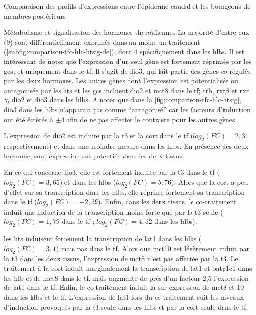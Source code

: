 \documentclass[../main.tex]{subfiles}
\begin{document}
\begin{chapter}{Comparaison des profils d'expressions entre l'épiderme caudal et les bourgeons de membres postérieurs}
\begin{section}{Métabolisme et signalisation des hormones thyroïdiennes}
La majorité d'entre eux (9) sont différentiellement exprimés dans au moins un traitement (\autoref{subfig:comparison-tfc-hlc-htsig-de}), dont 4 spécifiquement dans les \glspl{hlb}.
Il est intéressant de noter que l'expression d'un seul gène est fortement réprimée par les \glspl{gc}, et uniquement dans le \gls{tf}.
Il s'agit de \gls{dio3}, qui fait partie des gènes co-régulés par les deux hormones.
Les autres gènes dont l'expression est potentialisée ou antagonisée par les \glspl{ht} et les \glspl{gc} incluent \gls{dio2} et \gls{mct}8 dans le \gls{tf}; \gls{trb}, \gls{rxr}$\beta$ et \gls{rxr}$\gamma$, \gls{dio2} et \gls{dio3} dans les \glspl{hlb}.
A noter que dans la \autoref{fig:comparison-tfc-hlc-htsig}, \gls{dio3} dans les \glspl{hlb} n'apparait pas comme ``antagonisé'' car les facteurs d'induction ont été écrêtés à $\pm 4$ afin de ne pas affecter le contraste pour les autres gènes.
\par
L'expression de \gls{dio2} est induite par la \gls{t3} et la \gls{cort} dans le \gls{tf} ($log_2(FC)=2,31$ respectivement) et dans une moindre mesure dans les \glspl{hlb}.
En présence des deux hormone, sont expression est potentiée dans les deux tissus.
\par
En ce qui concerne \gls{dio3}, elle est fortement induite par la \gls{t3} dans le \gls{tf} ($log_2(FC)=3,65$) et dans les \glspl{hlb} ($log_2(FC)=5,76$).
Alors que la \gls{cort} a peu d'effet sur sa transcription dans les \glspl{hlb}, elle réprime fortement sa transcription dans le \gls{tf} ($log_2(FC)=-2,39$).
Enfin, dans les deux tissus, le co-traitement induit une induction de la transcription moins forte que par la \gls{t3} seule ($log_2(FC)=1,79$ dans le \gls{tf} ; $log_2(FC)=4,52$ dans les \glspl{hlb}).
\par
les \glspl{ht} induisent fortement la transcription de \gls{lat}1 dans les \glspl{hlb} ($log_2(FC)=3,1$) mais pas dans le \gls{tf}.
Alors que \gls{mct}10 est légèrement induit par la \gls{t3} dans les deux tissus, l'expression de \gls{mct}8 n'est pas affectée par la \gls{t3}.
Le traitement à la \gls{cort} induit marginalement la transcription de \gls{lat}1 et \gls{oatp}1c1 dans les \gls{hlb} et de \gls{mct}8 dans le \gls{tf}, mais augmente de près d'un facteur 2,5 l'expression de \gls{lat}1 dans le \gls{tf}.
Enfin, le co-traitement induit la sur-expression de \gls{mct}8 et 10 dans les \glspl{hlb} et le \gls{tf}.
L'expression de \gls{lat}1 lors du co-traitement suit les niveaux d'induction provoqués par la \gls{t3} seule dans les \glspl{hlb} et par la \gls{cort} seule dans le \gls{tf}.

\end{section}

\end{chapter}
\end{document}

